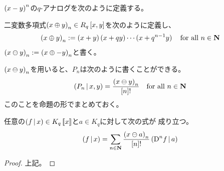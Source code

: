 {	$\mathinner{({x-y})}^n$の$q$-アナログを次のように定義する。

	\begin{definition}\label{def:正ベキのq-アナログ} %
		二変数多項式$\mathinner{({x\oplus y})}_n\in R_q\mathinner{[{x,y}]}$を次のように定義し、
		\begin{equation*}\begin{split}
			\mathinner{({x\oplus y})}_n := \mathinner{({x+y})}\mathinner{({x+qy})}\cdots\mathinner{({x+q^{n-1}y})}
			\quad\text{for all } n\in\mathbf{N}
		\end{split}\end{equation*}
		$\mathinner{({x\ominus y})}_n := \mathinner{({x\oplus -y})}_n$と書く。\EOP
	\end{definition} %

	$\mathinner{({x\ominus y})}_n$を用いると、$P_n$は次のように書くことができる。
	\begin{equation*}\begin{split}
		\mathinner{({P_n{\,|\,}x,y})} = \frac{\mathinner{({x\ominus y})}_n}{{\mathinner{[{n}]}}!}
		\quad\text{for all } n\in\mathbf{N}
	\end{split}\end{equation*}
	このことを命題の形でまとめておく。

	\begin{proposition}[Talor展開その二]\label{prop:Talor展開その二} %
		任意の$\mathinner{({f{\,|\,}x})}\in K_q\mathinner{[\![{x}]\!]}$と$a\in K_q$に対して次の式が
		成り立つ。
		\begin{equation*}\begin{split}
			\mathinner{({f{\,|\,}x})} = \sum_{n\in\mathbf{N}}
			\frac{\mathinner{({x\ominus a})}_n}{{\mathinner{[{n}]}}!}\mathinner{({{\mathinner{\operatorname{D}}}^nf{\,|\,}a})}
		\end{split}\end{equation*}
	\end{proposition} %
	\begin{proof} %
		上記。
	\end{proof} %

	\begin{comment} %
	任意の$\plr{f\bou x}\in K_q\bblr{x}$に対して次の式が成り立ち、
	\begin{equation*}\begin{split}
		\sum_{n\in\sizen}\frac{\plr{x - y}^n}{n!}\plr{\partial^nf\bou y}
		= \plr{f\bou x}
		= \sum_{n\in\sizen}\frac{\plr{x\ominus y}_n}{\q{n}!}\plr{\qD^nf\bou y}
	\end{split}\end{equation*}
	並進の変換がq-微分を用いて次のように書けることがわかる。
	\begin{equation*}\begin{split}
		\sum_{n\in\sizen}\frac{\plr{x - y}^n}{n!}\partial_y^n
		= \sum_{n\in\sizen}\frac{\plr{x\ominus y}_n}{\q{n}!}\qD_y^n
	\end{split}\end{equation*}
	並進変換は群なので、並進変換の逆をq-微分を用いて表示できそうである。
	\end{comment} %

}

